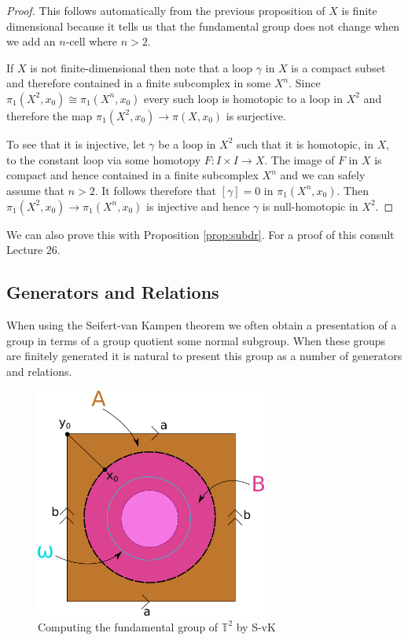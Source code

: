 \documentclass[11pt]{article}
\begin{document}
\begin{proof}
This follows automatically from the previous proposition of $X$ is finite dimensional because it tells us that the fundamental group does not change when we add an $n$-cell where $n>2$.

If $X$ is not finite-dimensional then note that a loop $\gamma$ in $X$ is a compact subset and therefore contained in a finite subcomplex in some $X^n$. Since $\pi_1(X^2, x_0)\cong \pi_1(X^n, x_0)$ every such loop is homotopic to a loop in $X^2$ and therefore the map $\pi_1(X^2, x_0)\to \pi(X, x_0)$ is surjective.

To see that it is injective, let $\gamma$ be a loop in $X^2$ such that it is homotopic, in $X$, to the constant loop via some homotopy $F:I\times I \to X$.
The image of $F$ in $X$ is compact and hence contained in a finite subcomplex $X^n$ and we can safely assume that $n>2$.
It follows therefore that $\left[\gamma\right]=0$ in $\pi_1(X^n, x_0)$.
Then $\pi_1(X^2, x_0)\to\pi_1(X^n, x_0)$ is injective and hence $\gamma$ is null-homotopic in $X^2$.
\end{proof}

We can also prove this with Proposition \ref{prop:subdr}.
For a proof of this consult Lecture 26.

\subsection{Generators and Relations}

When using the Seifert-van Kampen theorem we often obtain a presentation of a group in terms of a group quotient some normal subgroup.
When these groups are finitely generated it is natural to present this group as a number of generators and relations.


\begin{figure}[ht]
	\centering
	\includegraphics[width=3in]{torussvk.png}
	\caption{Computing the fundamental group of $\mathbb{T}^2$ by S-vK}
	\label{fig:torussvk}
\end{figure}
\end{document}
